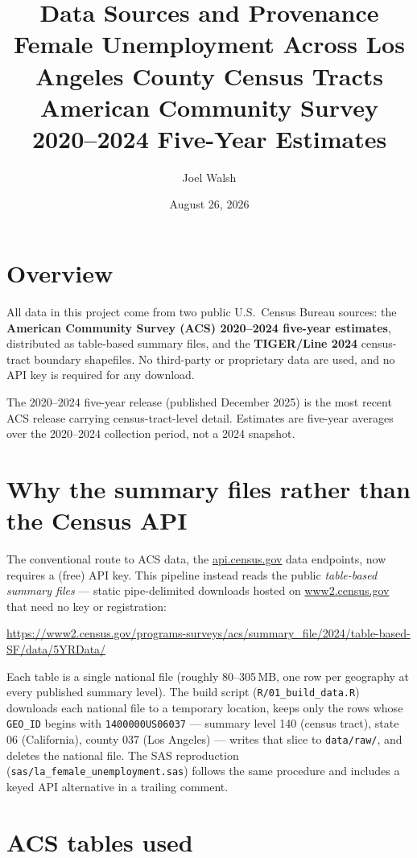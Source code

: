 \documentclass[11pt]{article}
\title{Data Sources and Provenance\\[4pt]
\large Female Unemployment Across Los Angeles County Census Tracts\\
American Community Survey 2020--2024 Five-Year Estimates}
\author{Joel Walsh}
\date{August 26, 2026}
\begin{document}
\maketitle

\section{Overview}

All data in this project come from two public U.S.\ Census Bureau sources:
the \textbf{American Community Survey (ACS) 2020--2024 five-year estimates},
distributed as table-based summary files, and the \textbf{TIGER/Line 2024}
census-tract boundary shapefiles. No third-party or proprietary data are
used, and no API key is required for any download.

The 2020--2024 five-year release (published December 2025) is the most
recent ACS release carrying census-tract-level detail. Estimates are
five-year averages over the 2020--2024 collection period, not a 2024
snapshot.

\section{Why the summary files rather than the Census API}

The conventional route to ACS data, the \url{api.census.gov} data
endpoints, now requires a (free) API key. This pipeline instead reads the
public \emph{table-based summary files} --- static pipe-delimited downloads
hosted on \url{www2.census.gov} that need no key or registration:

\begin{center}
\small\url{https://www2.census.gov/programs-surveys/acs/summary_file/2024/table-based-SF/data/5YRData/}
\end{center}

Each table is a single national file (roughly 80--305\,MB, one row per
geography at every published summary level). The build script
(\texttt{R/01\_build\_data.R}) downloads each national file to a temporary
location, keeps only the rows whose \texttt{GEO\_ID} begins with
\texttt{1400000US06037} --- summary level 140 (census tract), state 06
(California), county 037 (Los Angeles) --- writes that slice to
\texttt{data/raw/}, and deletes the national file. The SAS reproduction
(\texttt{sas/la\_female\_unemployment.sas}) follows the same procedure and
includes a keyed API alternative in a trailing comment.

\section{ACS tables used}
\end{document}
